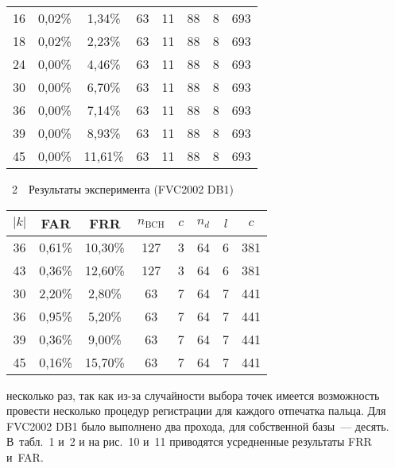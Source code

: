 \begin{multicols}{2}
\begin{center}
{\begin{tabular}{|c|c|c|c|c|c|c|c|}
\hline
16&0,02\%&\hphantom{9}1,34\%&63&11&88&8&693\\
18&0,02\%&\hphantom{9}2,23\%&63&11&88&8&693\\
24&0,00\%&\hphantom{9}4,46\%&63&11&88&8&693\\
30&0,00\%&\hphantom{9}\hphantom{9}6,70\%&63&11&88&8&693\\
36&0,00\%&\hphantom{9}7,14\%&63&11&88&8&693\\
39&0,00\%&\hphantom{9}8,93\%&63&11&88&8&693\\
45&0,00\%&11,61\%&63&11&88&8&693\\
\hline
\end{tabular}

}
\end{center}

\vspace*{3pt}

\begin{center}
\noindent
{{\tablename~2}\ \ \small{Результаты эксперимента (FVC2002 DB1)}}

\vspace*{9pt}

{\small 
\tabcolsep=6.2pt
\begin{tabular}
{|c|c|c|c|c|c|c|c|}
\hline
$\vert k\vert$&FAR&FRR&$n_{\mathrm{BCH}}$&$c$&$n_d$&$l$&$c$\\
\hline
36&0,61\%&10,30\%&127&3&64&6&381\\
43&0,36\%&12,60\%&127&3&64&6&381\\
\hline
30&2,20\%&\hphantom{9}2,80\%&\hphantom{9}63&7&64&7&441\\
36&0,95\%&\hphantom{9}5,20\%&\hphantom{9}63&7&64&7&441\\
39&0,36\%&\hphantom{9}9,00\%&\hphantom{9}63&7&64&7&441\\
45&0,16\%&15,70\%&\hphantom{9}63&7&64&7&441\\
\hline
\end{tabular}

}
\end{center}
\vspace*{6pt}


\smallskip
\addtocounter{table}{1}






\noindent
 несколько раз, так 
как из-за случайности выбора точек имеется возможность провести несколько процедур 
регистрации для каждого отпечатка пальца. Для FVC2002 DB1 было выполнено два 
прохода, для собственной базы~--- десять. В~табл.~1 и~2 
и на рис.~10 и~11 приводятся усредненные 
результаты FRR и~FAR. 


\end{multicols}
